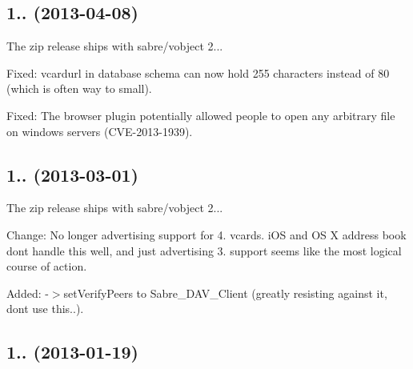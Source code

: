\subsection*{1.. (2013-\/04-\/08) }


\begin{DoxyItemize}
\item The zip release ships with sabre/vobject 2...
\item Fixed\+: vcardurl in database schema can now hold 255 characters instead of 80 (which is often way to small).
\item Fixed\+: The browser plugin potentially allowed people to open any arbitrary file on windows servers (C\+V\+E-\/2013-\/1939).
\end{DoxyItemize}

\subsection*{1.. (2013-\/03-\/01) }


\begin{DoxyItemize}
\item The zip release ships with sabre/vobject 2...
\item Change\+: No longer advertising support for 4. vcards. i\+OS and OS X address book don\textquotesingle{}t handle this well, and just advertising 3. support seems like the most logical course of action.
\item Added\+: -\/$>$set\+Verify\+Peers to Sabre\+\_\+\+D\+A\+V\+\_\+\+Client (greatly resisting against it, don\textquotesingle{}t use this..).
\end{DoxyItemize}

\subsection*{1.. (2013-\/01-\/19) }


